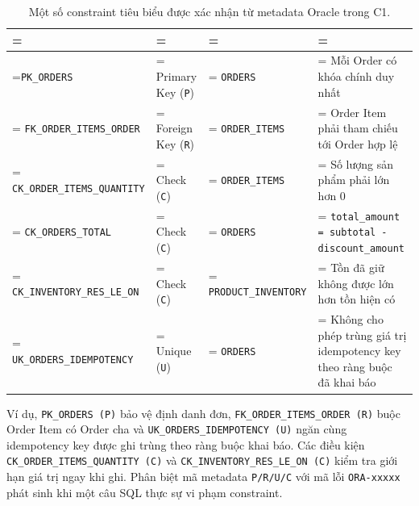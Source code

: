 \begin{table}[H]
\centering
\caption{Một số constraint tiêu biểu được xác nhận từ metadata Oracle trong C1.}\label{tab:tx-4}
\reporttablesetup
\footnotesize
\begin{tabularx}{\linewidth}{|>{\hsize\linewidth=\hsize}L|>{\hsize\linewidth=\hsize}L|>{\hsize\linewidth=\hsize}L|>{\hsize\linewidth=\hsize}L|}
\hline
{}
 &  &  &  \\ \hline
\texttt{PK\_\allowbreak{}ORDERS} & Primary Key (\texttt{P}) & \texttt{ORDERS} & Mỗi Order có khóa chính duy nhất \\ \hline
\texttt{FK\_\allowbreak{}ORDER\_\allowbreak{}ITEMS\_\allowbreak{}ORDER} & Foreign Key (\texttt{R}) & \texttt{ORDER\_\allowbreak{}ITEMS} & Order Item phải tham chiếu tới Order hợp lệ \\ \hline
\texttt{CK\_\allowbreak{}ORDER\_\allowbreak{}ITEMS\_\allowbreak{}QUANTITY} & Check (\texttt{C}) & \texttt{ORDER\_\allowbreak{}ITEMS} & Số lượng sản phẩm phải lớn hơn 0 \\ \hline
\texttt{CK\_\allowbreak{}ORDERS\_\allowbreak{}TOTAL} & Check (\texttt{C}) & \texttt{ORDERS} & \texttt{total\_\allowbreak{}amount =\allowbreak{} subtotal -\allowbreak{} discount\_\allowbreak{}amount} \\ \hline
\texttt{CK\_\allowbreak{}INVENTORY\_\allowbreak{}RES\_\allowbreak{}LE\_\allowbreak{}ON} & Check (\texttt{C}) & \texttt{PRODUCT\_\allowbreak{}INVENTORY} & Tồn đã giữ không được lớn hơn tồn hiện có \\ \hline
\texttt{UK\_\allowbreak{}ORDERS\_\allowbreak{}IDEMPOTENCY} & Unique (\texttt{U}) & \texttt{ORDERS} & Không cho phép trùng giá trị idempotency key theo ràng buộc đã khai báo \\ \hline
\end{tabularx}
\end{table}
Ví dụ, \texttt{PK\_\allowbreak{}ORDERS (P)} bảo vệ định danh đơn, \texttt{FK\_\allowbreak{}ORDER\_\allowbreak{}ITEMS\_\allowbreak{}ORDER (R)} buộc Order Item có Order cha và \texttt{UK\_\allowbreak{}ORDERS\_\allowbreak{}IDEMPOTENCY (U)} ngăn cùng idempotency key được ghi trùng theo ràng buộc khai báo. Các điều kiện \texttt{CK\_\allowbreak{}ORDER\_\allowbreak{}ITEMS\_\allowbreak{}QUANTITY (C)} và \texttt{CK\_\allowbreak{}INVENTORY\_\allowbreak{}RES\_\allowbreak{}LE\_\allowbreak{}ON (C)} kiểm tra giới hạn giá trị ngay khi ghi. Phân biệt mã metadata \texttt{P/\allowbreak{}R/\allowbreak{}U/\allowbreak{}C} với mã lỗi \texttt{ORA-\allowbreak{}xxxxx} phát sinh khi một câu SQL thực sự vi phạm constraint.

